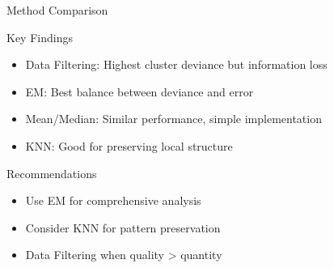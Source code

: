 \documentclass{beamer}
\begin{document}
\begin{frame}{Method Comparison}
    \begin{block}{Key Findings}
        \begin{itemize}
            \item Data Filtering: Highest cluster deviance but information loss
            \item EM: Best balance between deviance and error
            \item Mean/Median: Similar performance, simple implementation
            \item KNN: Good for preserving local structure
        \end{itemize}
    \end{block}

    \begin{block}{Recommendations}
        \begin{itemize}
            \item Use EM for comprehensive analysis
            \item Consider KNN for pattern preservation
            \item Data Filtering when quality > quantity
        \end{itemize}
    \end{block}
\end{frame}
\end{document}

